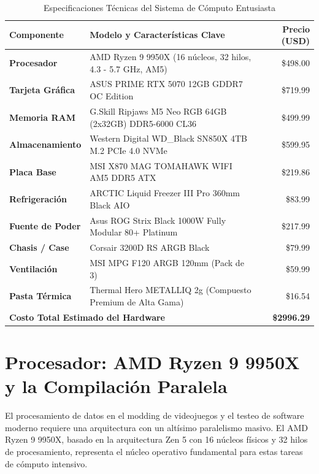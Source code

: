 \documentclass[12pt,a4paper]{article}
\begin{document}
\begin{table}[h!]
\small
\centering
\caption{Especificaciones Técnicas del Sistema de Cómputo Entusiasta}
\vspace{0.3cm}
\begin{tabularx}{\textwidth}{l X r}
\toprule
\textbf{Componente} & \textbf{Modelo y Características Clave} & \textbf{Precio (USD)} \\
\midrule
\textbf{Procesador} & AMD Ryzen 9 9950X (16 núcleos, 32 hilos, 4.3 - 5.7 GHz, AM5) & \$498.00 \\
\textbf{Tarjeta Gráfica} & ASUS PRIME RTX 5070 12GB GDDR7 OC Edition & \$719.99 \\
\textbf{Memoria RAM} & G.Skill Ripjaws M5 Neo RGB 64GB (2x32GB) DDR5-6000 CL36 & \$499.99 \\
\textbf{Almacenamiento} & Western Digital WD\_Black SN850X 4TB M.2 PCIe 4.0 NVMe & \$599.95 \\
\textbf{Placa Base} & MSI X870 MAG TOMAHAWK WIFI AM5 DDR5 ATX & \$219.86 \\
\textbf{Refrigeración} & ARCTIC Liquid Freezer III Pro 360mm Black AIO & \$83.99 \\
\textbf{Fuente de Poder} & Asus ROG Strix Black 1000W Fully Modular 80+ Platinum & \$217.99 \\
\textbf{Chasis / Case} & Corsair 3200D RS ARGB Black & \$79.99 \\
\textbf{Ventilación} & MSI MPG F120 ARGB 120mm (Pack de 3) & \$59.99 \\
\textbf{Pasta Térmica} & Thermal Hero METALLIQ 2g (Compuesto Premium de Alta Gama) & \$16.54 \\
\midrule
\multicolumn{2}{l}{\textbf{Costo Total Estimado del Hardware}} & \textbf{\$2996.29} \\
\bottomrule
\end{tabularx}
\end{table}

\newpage

\section{Procesador: AMD Ryzen 9 9950X y la Compilación Paralela}

El procesamiento de datos en el modding de videojuegos y el testeo de software moderno requiere una arquitectura con un altísimo paralelismo masivo. El AMD Ryzen 9 9950X, basado en la arquitectura Zen 5 con 16 núcleos físicos y 32 hilos de procesamiento, representa el núcleo operativo fundamental para estas tareas de cómputo intensivo.
\end{document}
